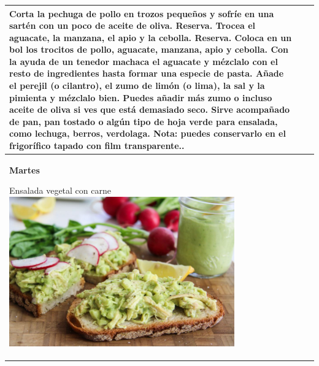 \documentclass[menu.tex]{subfiles}
\begin{document}
\begin{tabular} {p{3.5cm} p{4cm} p{9cm}}
            \vspace{-2cm}
            Corta la pechuga de pollo en trozos pequeños y sofríe en una sartén con un poco de aceite de oliva. Reserva. Trocea el aguacate, la manzana, el apio y la cebolla. Reserva. Coloca en un bol los trocitos de pollo, aguacate, manzana, apio y cebolla. Con la ayuda de un tenedor machaca el aguacate y mézclalo con el resto de ingredientes hasta formar una especie de pasta. Añade el perejil (o cilantro), el zumo de limón (o lima), la sal y la pimienta y mézclalo bien. Puedes añadir más zumo o incluso aceite de oliva si ves que está demasiado seco. Sirve acompañado de pan, pan tostado o algún tipo de hoja verde para ensalada, como lechuga, berros, verdolaga. Nota: puedes conservarlo en el frigorífico tapado con film transparente.. \\ \hline
            
            \pbox{20cm}{\rule{0pt}{3ex}\begin{large}\textbf{Martes}\end{large}\\ \rule{0pt}{4ex}Ensalada vegetal con carne\\ \includegraphics[scale=0.35]{pollo-con-palta} } &
            \vspace{-1.6cm}
            

\end{tabular}
\end{document}
